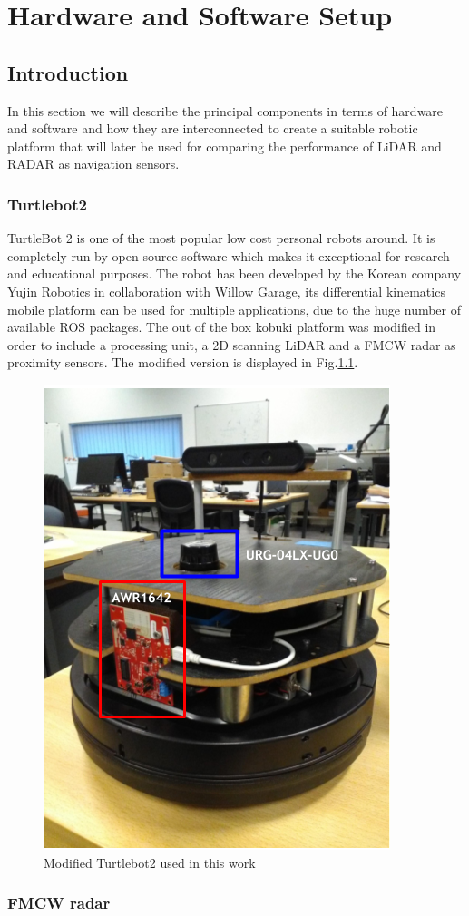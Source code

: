 \chapter{Hardware and Software Setup}

\section{Introduction}
In this section we will describe the principal components in terms of hardware and software and how they are interconnected to create a suitable robotic platform that will later be used for comparing the performance of \ac{LiDAR} and \ac{RADAR} as navigation sensors.  
\subsection{Turtlebot2}
TurtleBot 2 \fig{} is one of the  most popular low cost personal robots around. It is completely run by open source software which makes it exceptional for research and educational purposes. The robot has been developed by the Korean company Yujin Robotics in collaboration with Willow Garage, its differential kinematics mobile platform can be used for multiple applications, due to the huge number of available ROS packages.
The out of the box kobuki platform was modified in order to include a processing unit, a 2D scanning \ac{LiDAR} and a \ac{FMCW} radar as proximity sensors. The modified version is displayed in Fig.\ref{fig::turlebot2}. 
\begin{figure}[h] 
\centerline{\includegraphics [width=0.3 \textwidth]{imgs/chapter4/turtlebot2.PNG}}
\caption{Modified Turtlebot2 used in this work}
\label{fig::turlebot2}
\end{figure}



\subsection{FMCW radar}


